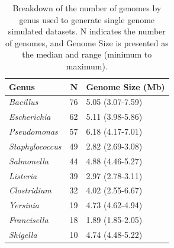 \documentclass[fleqn,10pt,lineno]{wlpeerj}\usepackage[]{graphicx}\usepackage[]{color}
\begin{document}
\begin{table}[ht]
\centering
\begin{tabular}{lrl}
  \hline
Genus & N & Genome Size (Mb) \\ 
  \hline
\textit{Bacillus} &  76 & 5.05 (3.07-7.59) \\ 
  \textit{Escherichia} &  62 & 5.11 (3.98-5.86) \\ 
  \textit{Pseudomonas} &  57 & 6.18 (4.17-7.01) \\ 
  \textit{Staphylococcus} &  49 & 2.82 (2.69-3.08) \\ 
  \textit{Salmonella} &  44 & 4.88 (4.46-5.27) \\ 
  \textit{Listeria} &  39 & 2.97 (2.78-3.11) \\ 
  \textit{Clostridium} &  32 & 4.02 (2.55-6.67) \\ 
  \textit{Yersinia} &  19 & 4.73 (4.62-4.94) \\ 
  \textit{Francisella} &  18 & 1.89 (1.85-2.05) \\ 
  \textit{Shigella} &  10 & 4.74 (4.48-5.22) \\ 
   \hline
\end{tabular}
\caption{Breakdown of the number of genomes by genus used to generate single genome simulated datasets. N indicates the number of genomes, and Genome Size is presented as the median and range (minimum to maximum).} 
\label{tab:single_org}
\end{table}
\end{document}
